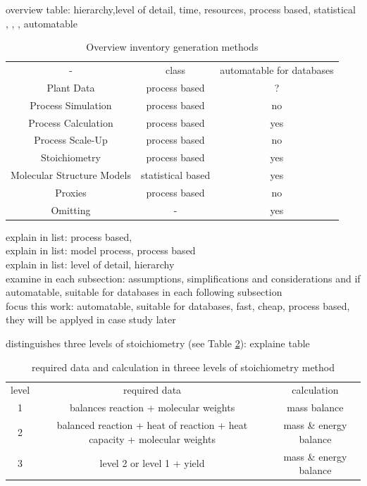 overview table: hierarchy,level of detail, time, resources,  process based, statistical , , , automatable\\

\begin{table}[]
    \centering
    \begin{tabular}{c|c|c}
-                           & class             & automatable for databases\\
Plant Data                  & process based     & ?\\
Process Simulation          &  process based    & no\\
Process Calculation         &  process based    & yes\\
Process Scale-Up            & process based     & no\\
Stoichiometry               & process based     & yes\\
Molecular Structure Models  & statistical based & yes\\
Proxies                     &  process based    & no\\
Omitting                    &   -               & yes\\
    \end{tabular}
    \caption{Overview inventory generation methods}
    \label{tab:my_label}
\end{table}

explain in list: process based, \\

explain in list: model process, process based\\

explain in list: level of detail, hierarchy\\

examine in each subsection: assumptions, simplifications and considerations and if  automatable, suitable for databases in each following subsection\\

focus this work: automatable, suitable for databases, fast, cheap, process based, they will be applyed in case study later

\cite{pavatker.2019} distinguishes three levels of stoichiometry (see Table \ref{3levelsstoichiometry}): explaine table 

\begin{table}[]
    \centering
    \begin{tabular}{c c c}
    level   & required data                         & calculation\\
     1      & balances reaction + molecular weights & mass balance \\
     2      & balanced reaction + heat of reaction + heat capacity + molecular weights & mass \& energy balance\\
     3      & level 2 or level 1 + yield & mass \& energy balance\\
    \end{tabular}
    \caption{required data and calculation in threee levels of stoichiometry method}
    \label{3levelsstoichiometry}
\end{table}{}
